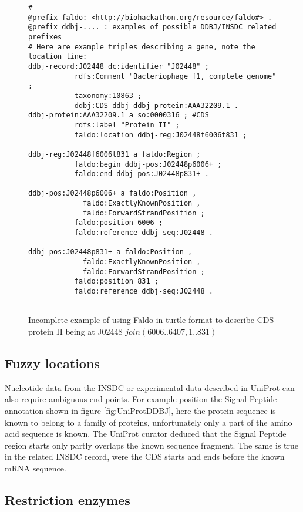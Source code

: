 \begin{figure}
\begin{shaded}
\small
\begin{verbatim}
# 
@prefix faldo: <http://biohackathon.org/resource/faldo#> .
@prefix ddbj-.... : examples of possible DDBJ/INSDC related prefixes
# Here are example triples describing a gene, note the location line:
ddbj-record:J02448 dc:identifier "J02448" ;
           rdfs:Comment "Bacteriophage f1, complete genome" ;
           taxonomy:10863 ;
           ddbj:CDS ddbj ddbj-protein:AAA32209.1 .
ddbj-protein:AAA32209.1 a so:0000316 ; #CDS
           rdfs:label "Protein II" ;
           faldo:location ddbj-reg:J02448f6006t831 ;

ddbj-reg:J02448f6006t831 a faldo:Region ;
           faldo:begin ddbj-pos:J02448p6006+ ;
           faldo:end ddbj-pos:J02448p831+ .

ddbj-pos:J02448p6006+ a faldo:Position ,
             faldo:ExactlyKnownPosition ,
             faldo:ForwardStrandPosition ;
           faldo:position 6006 ;
           faldo:reference ddbj-seq:J02448 .

ddbj-pos:J02448p831+ a faldo:Position , 
             faldo:ExactlyKnownPosition ,
             faldo:ForwardStrandPosition ;
           faldo:position 831 ;
           faldo:reference ddbj-seq:J02448 .
           
\end{verbatim}
\end{shaded}
\caption{Incomplete example of using Faldo in turtle format to describe
CDS protein II being at J02448 $join(6006..6407,1..831)$}
\label{fig:insdcReverseOverOrigin}
\end{figure}


\subsection*{Fuzzy locations}
Nucleotide data from the INSDC or experimental data described in UniProt can also require ambiguous end points. 
For example position the Signal Peptide annotation shown in figure \ref{fig:UniProtDDBJ}, 
here the protein sequence is known to belong to a family of proteins, unfortunately only a part of the amino acid sequence is known. 
The UniProt curator deduced that the Signal Peptide region starts only partly overlaps the known sequence fragment.
The same is true in the related INSDC record, were the CDS starts and ends before the known mRNA sequence.

\subsection*{Restriction enzymes}

